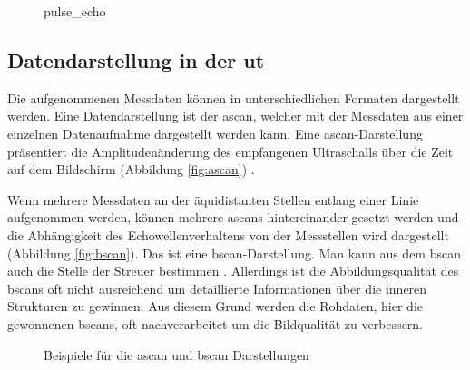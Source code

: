 \begin{figure}[h!]
\begin{center}
\caption[Puls-Echo-Verfahren]{\gls{pulse_echo}}
\label{fig:pulse_echo}
\end{center}
\end{figure}


\subsection{Datendarstellung in der \acrfull{ut}} \label{sec:pulse_echo}
Die aufgenommenen Messdaten können in unterschiedlichen Formaten dargestellt werden. Eine Datendarstellung ist der \gls{ascan}, welcher mit der Messdaten aus einer einzelnen Datenaufnahme dargestellt werden kann. Eine \gls{ascan}-Darstellung präsentiert die Amplitudenänderung des empfangenen Ultraschalls über die Zeit auf dem Bildschirm (Abbildung \ref{fig:ascan}) \cite{UTDataPresentation}. \par
Wenn mehrere Messdaten an der äquidistanten Stellen entlang einer Linie aufgenommen werden, können mehrere \glspl{ascan} hintereinander gesetzt werden und die Abhängigkeit des Echowellenverhaltens von der Messstellen wird dargestellt (Abbildung \ref{fig:bscan}). Das ist eine \gls{bscan}-Darstellung.  Man kann aus dem \gls{bscan} auch die Stelle der Streuer bestimmen \cite{UTDataPresentation}. Allerdings ist die Abbildungsqualität des \gls{bscan}s oft nicht ausreichend um detaillierte Informationen über die inneren Strukturen zu gewinnen. Aus diesem Grund werden die Rohdaten, hier die gewonnenen \glspl{bscan}, oft nachverarbeitet um die Bildqualität zu verbessern.\par 

\begin{figure}[h!]
\begin{center}
\caption[A-Scan undB-Scan Darstellung]{Beispiele für die \gls{ascan} und \gls{bscan} Darstellungen}
\label{fig:ascan_bscan}
\end{center}
\end{figure}


